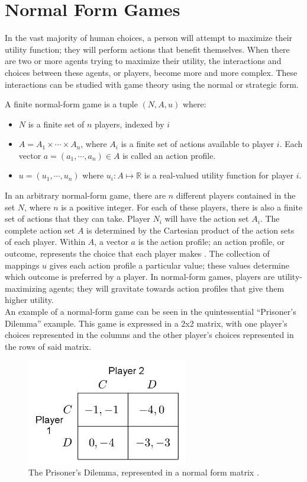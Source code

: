 \section{Normal Form Games}
In the vast majority of human choices, a person will attempt to maximize their utility function; they will perform actions that benefit themselves. When there are two or more agents trying to maximize their utility, the interactions and choices between these agents, or players, become more and more complex. These interactions can be studied with game theory using the normal or strategic form.
\begin{define}
  A finite normal-form game is a tuple $(N, A, u)$ where:
  \begin{itemize}
  \item $N$ is a finite set of $n$ players, indexed by $i$
  \item $A=A_1\times\cdots\times A_n$, where $A_i$ is a finite set of actions available to player $i$. Each vector $a=(a_1,\cdots ,a_n)\in A$ is called an action profile.
    \item $u=(u_1,\cdots ,u_n)$ where $u_i : A \mapsto\mathbb{R}$ is a real-valued utility function for player $i$. \cite{shoh09}
\end{itemize}
\end{define}

In an arbitrary normal-form game, there are $n$ different players contained in the set $N$, where $n$ is a positive integer. For each of these players, there is also a finite set of actions that they can take. Player $N_i$ will have the action set $A_i$. The complete action set $A$ is determined by the Cartesian product of the action sets of each player. Within $A$, a vector $a$ is the action profile; an action profile, or outcome, represents the choice that each player makes \cite{osbo94}. The collection of mappings $u$ gives each action profile a particular value; these values determine which outcome is preferred by a player. In normal-form games, players are utility-maximizing agents; they will gravitate towards action profiles that give them higher utility.\\

An example of a normal-form game can be seen in the quintessential ``Prisoner's Dilemma'' example. This game is expressed in a 2x2 matrix, with one player's choices represented in the columns and the other player's choices represented in the rows of said matrix.

\begin{figure}[H]
  \centering
  \includegraphics[width=7cm]{figures/ExampleGrid.png}
  \caption{The Prisoner's Dilemma, represented in a normal form matrix \cite{shoh09}.}
  \label{fig:prisoner}
\end{figure}

